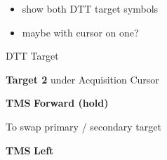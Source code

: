 \begin{checklistenumerate}
{{{\begin{minipage}[t][30mm][t]{\marginparwidth}
                \begin{itemize}[leftmargin=1em]
                    \item show both DTT target symbols
                    \item maybe with cursor on one?
                \end{itemize}
            \end{minipage}
        }
        \caption{DTT Target}
    }
    \begin{subenumerate}
        \item \textbf{Target 2} \dotfill under Acquisition Cursor
        \item \textbf{TMS} \dotfill \textbf{Forward (hold)}
    \end{subenumerate}

    To swap primary / secondary target

    \begin{subenumerate}[start=3]
        \item \textbf{TMS} \dotfill \textbf{Left}
    \end{subenumerate}
    }
\end{checklistenumerate}

